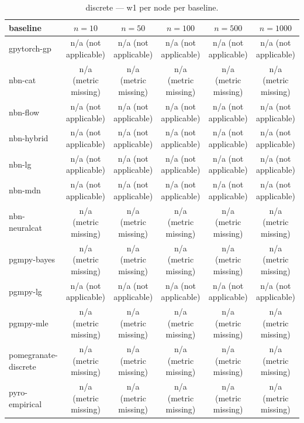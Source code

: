 \begin{table}[h]
\centering
\caption{discrete — w1 per node per baseline.}
\label{tab:discrete_w1_per_node}
\begin{tabular}{lccccc}
\toprule
baseline & $n=10$ & $n=50$ & $n=100$ & $n=500$ & $n=1000$ \\
\midrule
gpytorch-gp & n/a (not applicable) & n/a (not applicable) & n/a (not applicable) & n/a (not applicable) & n/a (not applicable) \\
nbn-cat & n/a (metric missing) & n/a (metric missing) & n/a (metric missing) & n/a (metric missing) & n/a (metric missing) \\
nbn-flow & n/a (not applicable) & n/a (not applicable) & n/a (not applicable) & n/a (not applicable) & n/a (not applicable) \\
nbn-hybrid & n/a (not applicable) & n/a (not applicable) & n/a (not applicable) & n/a (not applicable) & n/a (not applicable) \\
nbn-lg & n/a (not applicable) & n/a (not applicable) & n/a (not applicable) & n/a (not applicable) & n/a (not applicable) \\
nbn-mdn & n/a (not applicable) & n/a (not applicable) & n/a (not applicable) & n/a (not applicable) & n/a (not applicable) \\
nbn-neuralcat & n/a (metric missing) & n/a (metric missing) & n/a (metric missing) & n/a (metric missing) & n/a (metric missing) \\
pgmpy-bayes & n/a (metric missing) & n/a (metric missing) & n/a (metric missing) & n/a (metric missing) & n/a (metric missing) \\
pgmpy-lg & n/a (not applicable) & n/a (not applicable) & n/a (not applicable) & n/a (not applicable) & n/a (not applicable) \\
pgmpy-mle & n/a (metric missing) & n/a (metric missing) & n/a (metric missing) & n/a (metric missing) & n/a (metric missing) \\
pomegranate-discrete & n/a (metric missing) & n/a (metric missing) & n/a (metric missing) & n/a (metric missing) & n/a (metric missing) \\
pyro-empirical & n/a (metric missing) & n/a (metric missing) & n/a (metric missing) & n/a (metric missing) & n/a (metric missing) \\
\bottomrule
\end{tabular}
\end{table}

